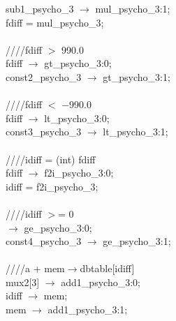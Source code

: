 {   \hspace*{2em}sub1\_psycho\_3 $\rightarrow$ mul\_psycho\_3:1; \\
   \hspace*{2em}fdiff = mul\_psycho\_3; \\
   \\
   \hspace*{2em}////fdiff $>$ 990.0 \\
   \hspace*{2em}fdiff $\rightarrow$ gt\_psycho\_3:0; \\
   \hspace*{2em}const2\_psycho\_3 $\rightarrow$ gt\_psycho\_3:1; \\
   \\
   \hspace*{2em}////fdiff $<$ $-$990.0 \\
   \hspace*{2em}fdiff $\rightarrow$ lt\_psycho\_3:0; \\
   \hspace*{2em}const3\_psycho\_3 $\rightarrow$ lt\_psycho\_3:1; \\
   \\
   \hspace*{2em}////idiff = (int) fdiff \\
   \hspace*{2em}fdiff $\rightarrow$ f2i\_psycho\_3:0; \\
   \hspace*{2em}idiff = f2i\_psycho\_3; \\
   \\
   \hspace*{2em}////idiff $>$= 0 \\
   \hspace*{2em} $\rightarrow$ ge\_psycho\_3:0; \\
   \hspace*{2em}const4\_psycho\_3 $\rightarrow$ ge\_psycho\_3:1; \\
   \\
   \hspace*{2em}////a + mem$\rightarrow$dbtable[idiff] \\
   \hspace*{2em}mux2[3] $\rightarrow$ add1\_psycho\_3:0; \\
   \hspace*{2em}idiff $\rightarrow$ mem; \\
   \hspace*{2em}mem $\rightarrow$ add1\_psycho\_3:1; \\
}
